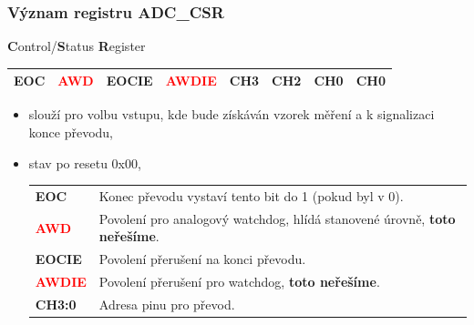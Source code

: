 	\begin{frame}
    \frametitle{Význam registru ADC\_CSR}

		\textbf{C}ontrol/\textbf{S}tatus \textbf{R}egister

\begin{center}
			\tiny
			\begin{tabular}{| p{9mm} | p{9mm} | p{9mm} | p{9mm} | p{9mm} | p{9mm} | p{9mm} | p{9mm} |}
				\hline
				\hline
				\textbf{EOC} & \textcolor{red}{\textbf{AWD}} & \textbf{EOCIE} & \textcolor{red}{\textbf{AWDIE}} & \textbf{CH3} & \textbf{CH2} & \textbf{CH0} & \textbf{CH0} \\
				\hline
				\hline
			\end{tabular}
		\end{center}
				
		\begin{itemize}
			\item slouží pro volbu vstupu, kde bude získáván vzorek měření a k signalizaci konce převodu,
			\item stav po resetu 0x00,
			\small
			\begin{center}
				\begin{tabular}{l p{80mm}}
					\textbf{EOC} & Konec převodu vystaví tento bit do 1 (pokud byl v 0). \\
					\textcolor{red}{\textbf{AWD}} & Povolení pro analogový watchdog, hlídá stanovené úrovně, \textbf{toto neřešíme}. \\
					\textbf{EOCIE} & Povolení přerušení na konci převodu. \\
					\textcolor{red}{\textbf{AWDIE}} & Povolení přerušení pro watchdog, \textbf{toto neřešíme}. \\
					\textbf{CH3:0} & Adresa pinu pro převod.
				\end{tabular}
			\end{center}
		\end{itemize}
		
	\end{frame}

